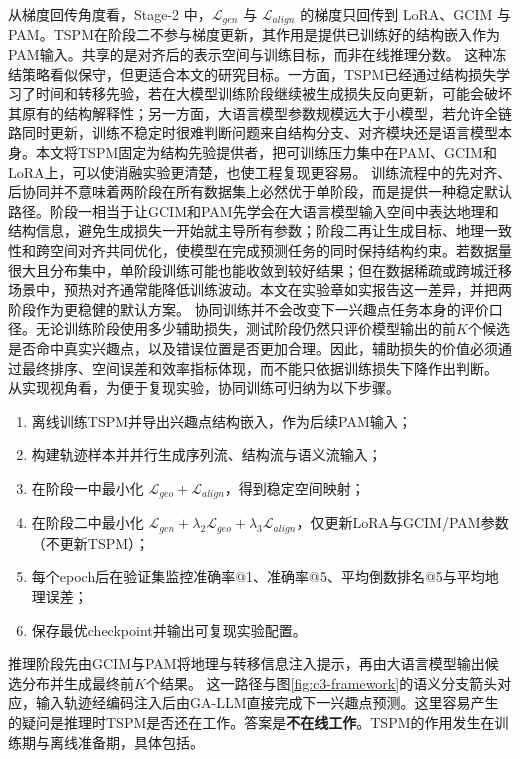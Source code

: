 从梯度回传角度看，Stage-2 中，$\mathcal{L}_{gen}$ 与 $\mathcal{L}_{align}$ 的梯度只回传到 LoRA、GCIM 与 PAM。TSPM在阶段二不参与梯度更新，其作用是提供已训练好的结构嵌入作为PAM输入。共享的是对齐后的表示空间与训练目标，而非在线推理分数。
这种冻结策略看似保守，但更适合本文的研究目标。一方面，TSPM已经通过结构损失学习了时间和转移先验，若在大模型训练阶段继续被生成损失反向更新，可能会破坏其原有的结构解释性；另一方面，大语言模型参数规模远大于小模型，若允许全链路同时更新，训练不稳定时很难判断问题来自结构分支、对齐模块还是语言模型本身。本文将TSPM固定为结构先验提供者，把可训练压力集中在PAM、GCIM和LoRA上，可以使消融实验更清楚，也使工程复现更容易。
训练流程中的先对齐、后协同并不意味着两阶段在所有数据集上必然优于单阶段，而是提供一种稳定默认路径。阶段一相当于让GCIM和PAM先学会在大语言模型输入空间中表达地理和结构信息，避免生成损失一开始就主导所有参数；阶段二再让生成目标、地理一致性和跨空间对齐共同优化，使模型在完成预测任务的同时保持结构约束。若数据量很大且分布集中，单阶段训练可能也能收敛到较好结果；但在数据稀疏或跨城迁移场景中，预热对齐通常能降低训练波动。本文在实验章如实报告这一差异，并把两阶段作为更稳健的默认方案。
协同训练并不会改变下一兴趣点任务本身的评价口径。无论训练阶段使用多少辅助损失，测试阶段仍然只评价模型输出的前$K$个候选是否命中真实兴趣点，以及错误位置是否更加合理。因此，辅助损失的价值必须通过最终排序、空间误差和效率指标体现，而不能只依据训练损失下降作出判断。
从实现视角看，为便于复现实验，协同训练可归纳为以下步骤。
\begin{enumerate}
    \item 离线训练TSPM并导出兴趣点结构嵌入，作为后续PAM输入；
    \item 构建轨迹样本并并行生成序列流、结构流与语义流输入；
    \item 在阶段一中最小化 $\mathcal{L}_{geo}+\mathcal{L}_{align}$，得到稳定空间映射；
    \item 在阶段二中最小化 $\mathcal{L}_{gen}+\lambda_2\mathcal{L}_{geo}+\lambda_3\mathcal{L}_{align}$，仅更新LoRA与GCIM/PAM参数（不更新TSPM）；
    \item 每个epoch后在验证集监控准确率@1、准确率@5、平均倒数排名@5与平均地理误差；
    \item 保存最优checkpoint并输出可复现实验配置。
\end{enumerate}
\par\indent 推理阶段先由GCIM与PAM将地理与转移信息注入提示，再由大语言模型输出候选分布并生成最终前$K$个结果。
这一路径与图\ref{fig:c3-framework}的语义分支箭头对应，输入轨迹经编码注入后由GA-LLM直接完成下一兴趣点预测。这里容易产生的疑问是推理时TSPM是否还在工作。答案是\textbf{不在线工作}。TSPM的作用发生在训练期与离线准备期，具体包括。
